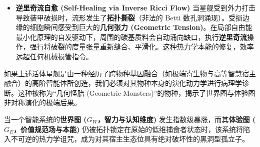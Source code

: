 \begin{itemize}
    \item \textbf{\textcolor{structurecolor}{逆里奇流自愈 (Self-Healing via Inverse Ricci Flow)}}
    当星舰受到外力打击导致装甲破损时，流形发生了\textbf{拓扑撕裂}（非法的 Betti 数孔洞涌现）。受损边缘的细胞瞬间感受到巨大的\textbf{几何张力 (Geometric Tension)}。在局部自由能最小化原理的自发驱动下，周围的碳基质料会自动涌向缺口，执行\textbf{逆里奇流}操作，强行将破裂的度量张量重新缝合、平滑化。这种热力学本能的修复，效率远超任何机械损管指令。
\end{itemize}


如果上述活体星舰是由一种经历了跨物种基因融合（如极端寄生物与高等智慧宿主融合）的高阶智能体所创造，我们必须对其物种本身的演化动力学进行病理学诊断。这种被称为“几何怪胎 (Geometric Monsters)”的物种，揭示了世界图与体验图非对称演化的极端后果。

\begin{theorem}
    当一个智能系统的\textbf{世界图 ($G_W$，智力与认知维度)} 发生指数级暴涨，而其\textbf{体验图 ($G_E$，价值规范场与本能)} 仍被拓扑锁定在原始的低维捕食者状态时，该系统将陷入不可逆的热力学诅咒，成为对其宿主生态位具有绝对破坏性的黑洞型孤立子。
\end{theorem}

